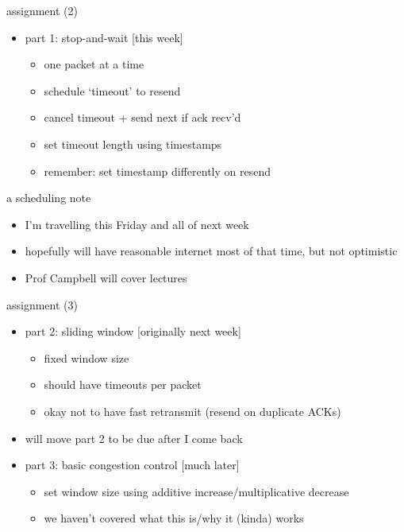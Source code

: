 \begin{frame}{assignment (2)}
    \begin{itemize}
    \item part 1: stop-and-wait [this week]
        \begin{itemize}
        \item one packet at a time
        \item schedule `timeout' to resend
        \item cancel timeout + send next if ack recv'd
        \item set timeout length using timestamps
        \item remember: set timestamp differently on resend
        \end{itemize}
    \end{itemize}
\end{frame}

\begin{frame}{a scheduling note}
    \begin{itemize}
    \item I'm travelling this Friday and all of next week
    \item hopefully will have reasonable internet most of that time, but not optimistic
    \vspace{.5cm}
    \item Prof Campbell will cover lectures
    \end{itemize}
\end{frame}

\begin{frame}{assignment (3)}
    \begin{itemize}
    \item part 2: sliding window [originally next week]
        \begin{itemize}
        \item fixed window size
        \item should have timeouts per packet
        \item okay not to have fast retransmit (resend on duplicate ACKs)
        \end{itemize}
    \item will move part 2 to be due after I come back
    \item part 3: basic congestion control [much later]
        \begin{itemize}
        \item set window size using additive increase/multiplicative decrease
        \item we haven't covered what this is/why it (kinda) works
        \end{itemize}
    \end{itemize}
\end{frame}

